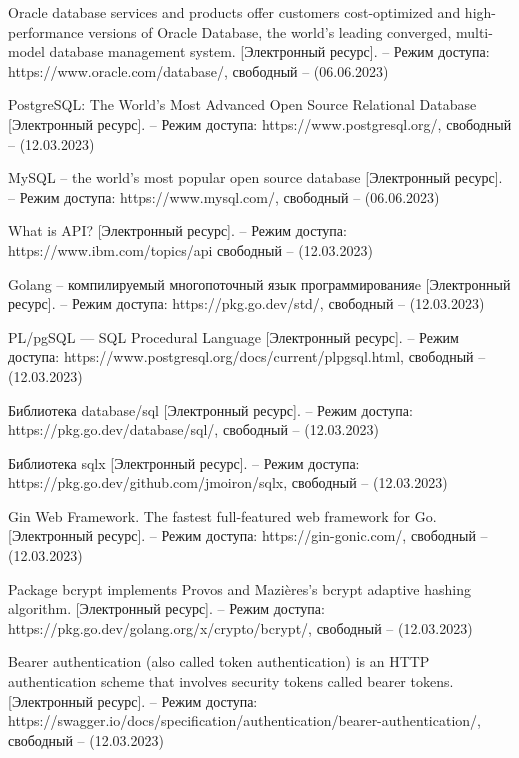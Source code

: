 \begin{thebibliography}{}
		Oracle database services and products offer customers cost-optimized and high-performance versions of Oracle Database, the world's leading converged, multi-model database management system. [Электронный ресурс]. -- Режим доступа: https://www.oracle.com/database/, свободный -- (06.06.2023)
		
		PostgreSQL: The World's Most Advanced Open Source Relational Database  [Электронный ресурс]. -- Режим доступа: https://www.postgresql.org/,
		свободный -- (12.03.2023)
		
		MySQL -- the world's most popular open source database   [Электронный ресурс]. -- Режим доступа: 	https://www.mysql.com/,
		свободный -- (06.06.2023)
		
		
		
		What is API?  [Электронный ресурс]. -- Режим доступа: https://www.ibm.com/topics/api свободный -- (12.03.2023)
		 
		
		Golang -- компилируемый многопоточный язык программированияe  [Электронный ресурс]. -- Режим доступа: https://pkg.go.dev/std/, свободный -- (12.03.2023)
		
		PL/pgSQL — SQL Procedural Language [Электронный ресурс]. -- Режим доступа: https://www.postgresql.org/docs/current/plpgsql.html, свободный -- (12.03.2023)
		
		
		Библиотека database/sql [Электронный ресурс]. -- Режим доступа: https://pkg.go.dev/database/sql/,
		свободный -- (12.03.2023)
		
		Библиотека sqlx [Электронный ресурс]. -- Режим доступа: https://pkg.go.dev/github.com/jmoiron/sqlx,
		свободный -- (12.03.2023)
		
		Gin Web Framework. The fastest full-featured web framework for Go. [Электронный ресурс]. -- Режим доступа: https://gin-gonic.com/, свободный -- (12.03.2023)
		
		Package bcrypt implements Provos and Mazières's bcrypt adaptive hashing algorithm. [Электронный ресурс]. -- Режим доступа: https://pkg.go.dev/golang.org/x/crypto/bcrypt/, свободный -- (12.03.2023)
		
		Bearer authentication (also called token authentication) is an HTTP authentication scheme that involves security tokens called bearer tokens. [Электронный ресурс]. -- Режим доступа: https://swagger.io/docs/specification/authentication/bearer-authentication/, свободный -- (12.03.2023)
		

\end{thebibliography}
